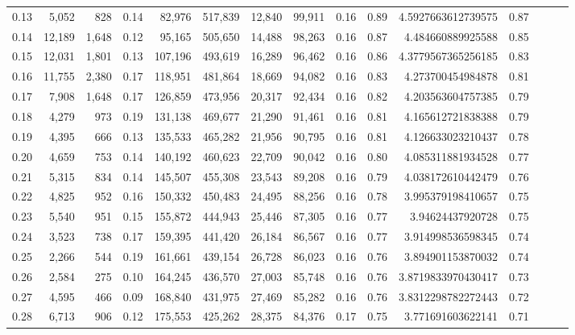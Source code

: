 \begin{tabular}{rrrrrrrrrrrrrrr}
0.13 &   5,052 &    828 &  0.14 &   82,976 &  517,839 &   12,840 &   99,911 &  0.16 &  0.89 &   4.5927663612739575 &      0.87 \\
0.14 &  12,189 &  1,648 &  0.12 &   95,165 &  505,650 &   14,488 &   98,263 &  0.16 &  0.87 &    4.484660889925588 &      0.85 \\
0.15 &  12,031 &  1,801 &  0.13 &  107,196 &  493,619 &   16,289 &   96,462 &  0.16 &  0.86 &   4.3779567365256185 &      0.83 \\
0.16 &  11,755 &  2,380 &  0.17 &  118,951 &  481,864 &   18,669 &   94,082 &  0.16 &  0.83 &    4.273700454984878 &      0.81 \\
0.17 &   7,908 &  1,648 &  0.17 &  126,859 &  473,956 &   20,317 &   92,434 &  0.16 &  0.82 &    4.203563604757385 &      0.79 \\
0.18 &   4,279 &    973 &  0.19 &  131,138 &  469,677 &   21,290 &   91,461 &  0.16 &  0.81 &    4.165612721838388 &      0.79 \\
0.19 &   4,395 &    666 &  0.13 &  135,533 &  465,282 &   21,956 &   90,795 &  0.16 &  0.81 &    4.126633023210437 &      0.78 \\
0.20 &   4,659 &    753 &  0.14 &  140,192 &  460,623 &   22,709 &   90,042 &  0.16 &  0.80 &    4.085311881934528 &      0.77 \\
0.21 &   5,315 &    834 &  0.14 &  145,507 &  455,308 &   23,543 &   89,208 &  0.16 &  0.79 &    4.038172610442479 &      0.76 \\
0.22 &   4,825 &    952 &  0.16 &  150,332 &  450,483 &   24,495 &   88,256 &  0.16 &  0.78 &    3.995379198410657 &      0.75 \\
0.23 &   5,540 &    951 &  0.15 &  155,872 &  444,943 &   25,446 &   87,305 &  0.16 &  0.77 &     3.94624437920728 &      0.75 \\
0.24 &   3,523 &    738 &  0.17 &  159,395 &  441,420 &   26,184 &   86,567 &  0.16 &  0.77 &    3.914998536598345 &      0.74 \\
0.25 &   2,266 &    544 &  0.19 &  161,661 &  439,154 &   26,728 &   86,023 &  0.16 &  0.76 &    3.894901153870032 &      0.74 \\
0.26 &   2,584 &    275 &  0.10 &  164,245 &  436,570 &   27,003 &   85,748 &  0.16 &  0.76 &   3.8719833970430417 &      0.73 \\
0.27 &   4,595 &    466 &  0.09 &  168,840 &  431,975 &   27,469 &   85,282 &  0.16 &  0.76 &   3.8312298782272443 &      0.72 \\
0.28 &   6,713 &    906 &  0.12 &  175,553 &  425,262 &   28,375 &   84,376 &  0.17 &  0.75 &    3.771691603622141 &      0.71 \\

\end{tabular}
